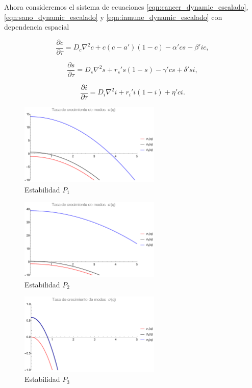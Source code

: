 \documentclass{article}
\begin{document}
Ahora consideremos el sistema de ecuaciones \ref{eqn:cancer_dynamic_escalado}, \ref{eqn:sano_dynamic_escalado} y \ref{eqn:inmune_dynamic_escalado} con dependencia espacial

\begin{equation}
    \frac{\partial c}{\partial \tau} = D_c \nabla ^2 c +  c (c - a')(1-c) - \alpha' cs - \beta' i c,
    \label{eqn:cancer_dynamict_escalado}
\end{equation}

\begin{equation}
    \frac{\partial s}{\partial \tau} = D_s \nabla ^2 s + r_s ' s (1 - s)  - \gamma' cs + \delta' si,
    \label{eqn:sano_dynamict_escalado}
\end{equation}


\begin{equation}
    \frac{\partial i}{\partial \tau} = D_i \nabla ^2 i + r_i ' i(1-i) + \eta' ci.
    \label{eqn:inmune_dynamict_escalado}
\end{equation}

\begin{figure}[ht]
    \centering
    \includegraphics[width=0.6\textwidth]{images/estabilidad_p1.pdf}
    \caption{Estabilidad $P_1$}
    \label{fig:estabilidad_p1}
\end{figure}


\begin{figure}[ht]
    \centering
    \includegraphics[width=0.6\textwidth]{images/estabilidad_p2.pdf}
    \caption{Estabilidad $P_2$}
    \label{fig:estabilidad_p2}
\end{figure}


\begin{figure}[ht]
    \centering
    \includegraphics[width=0.6\textwidth]{images/estabilidad_p3.pdf}
    \caption{Estabilidad $P_3$}
    \label{fig:estabilidad_p3}
\end{figure}


\newpage


\end{document}
